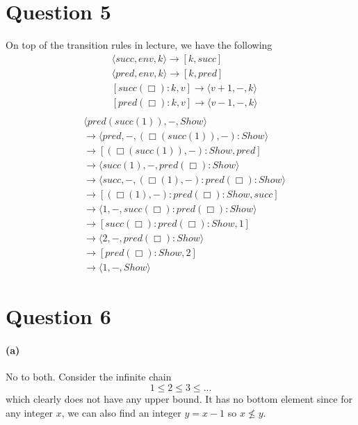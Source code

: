 \documentclass[11pt]{article} %
\begin{document}
\clearpage
\section*{Question 5}
On top of the transition rules in lecture, we have the following
\begin{equation}
\begin{aligned}
&\langle succ, env, k \rangle \rightarrow [k, succ]\\
&\langle pred, env, k \rangle \rightarrow [k, pred]\\
&[succ(\Box):k,v] \rightarrow \langle v+1, -, k\rangle\\
&[pred(\Box):k,v] \rightarrow \langle v-1, -, k\rangle\\
\end{aligned}
\end{equation}
\begin{equation}
\begin{aligned}
  &\langle pred (succ (1)), -, Show \rangle \\
  &\rightarrow \langle pred, -, (\Box(succ(1)), -):Show\rangle\\
  &\rightarrow [ (\Box(succ(1)), -):Show, pred]\\
  &\rightarrow \langle succ(1), -, pred(\Box): Show \rangle\\
  &\rightarrow \langle succ, -, (\Box(1), -):pred(\Box): Show \rangle\\
  &\rightarrow [ (\Box(1), -):pred(\Box): Show, succ ]\\
  &\rightarrow \langle 1, -, succ(\Box) :pred(\Box): Show \rangle\\
  &\rightarrow [ succ(\Box) :pred(\Box): Show , 1]\\
  &\rightarrow \langle 2, -, pred(\Box): Show \rangle\\
  &\rightarrow [ pred(\Box) : Show , 2]\\
  &\rightarrow \langle 1, -, Show \rangle
\end{aligned}
\end{equation}

\clearpage
\section*{Question 6}
\paragraph{(a)}
No to both.
Consider the infinite chain 
\[1\leq2\leq3\leq...\]
which clearly does not have any upper bound.
It has no bottom element since for any integer $x$, we can also find an integer $y=x-1$ so $x\not\leq y$.
\end{document}
